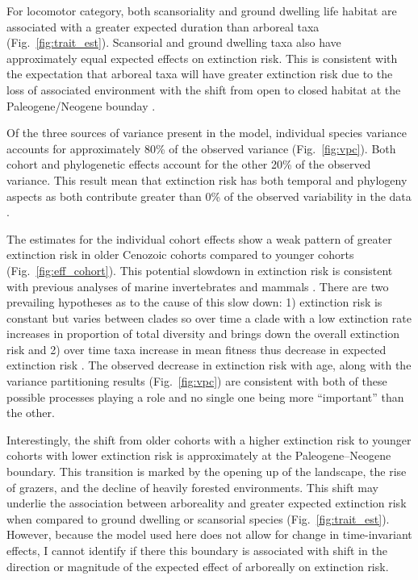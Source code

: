 \documentclass[12pt]{article}
\begin{document}
For locomotor category, both scansoriality and ground dwelling life habitat are associated with a greater expected duration than arboreal taxa (Fig.~\ref{fig:trait_est}). Scansorial and ground dwelling taxa also have approximately equal expected effects on extinction risk.  This is consistent with the expectation that arboreal taxa will have greater extinction risk due to the loss of associated environment with the shift from open to closed habitat at the Paleogene/Neogene bounday \cite{Blois2009}.

Of the three sources of variance present in the model, individual species variance accounts for approximately 80\% of the observed variance (Fig.~\ref{fig:vpc}). Both cohort and phylogenetic effects account for the other 20\% of the observed variance. This result mean that extinction risk has both temporal and phylogeny aspects as both contribute greater than 0\% of the observed variability in the data \cite{Housworth2004}.

The estimates for the individual cohort effects show a weak pattern of greater extinction risk in older Cenozoic cohorts compared to younger cohorts (Fig.~\ref{fig:eff_cohort}). This potential slowdown in extinction risk is consistent with previous analyses of marine invertebrates \cite{Raup1982a,Foote2003} and mammals \cite{Alroy2010c,Alroy2000g}. There are two prevailing hypotheses as to the cause of this slow down: 1) extinction risk is constant but varies between clades so over time a clade with a low extinction rate increases in proportion of total diversity and brings down the overall extinction risk and 2) over time taxa increase in mean fitness thus decrease in expected extinction risk \cite{Raup1982a}. The observed decrease in extinction risk with age, along with the variance partitioning results (Fig.~\ref{fig:vpc}) are consistent with both of these possible processes playing a role and no single one being more ``important'' than the other.

Interestingly, the shift from older cohorts with a higher extinction risk to younger cohorts with lower extinction risk is approximately at the Paleogene--Neogene boundary. This transition is marked by the opening up of the landscape, the rise of grazers, and the decline of heavily forested environments. This shift may underlie the association between arboreality and greater expected extinction risk when compared to ground dwelling or scansorial species (Fig.~\ref{fig:trait_est}). However, because the model used here does not allow for change in time-invariant effects, I cannot identify if there this boundary is associated with shift in the direction or magnitude of the expected effect of arboreally on extinction risk.
\end{document}
